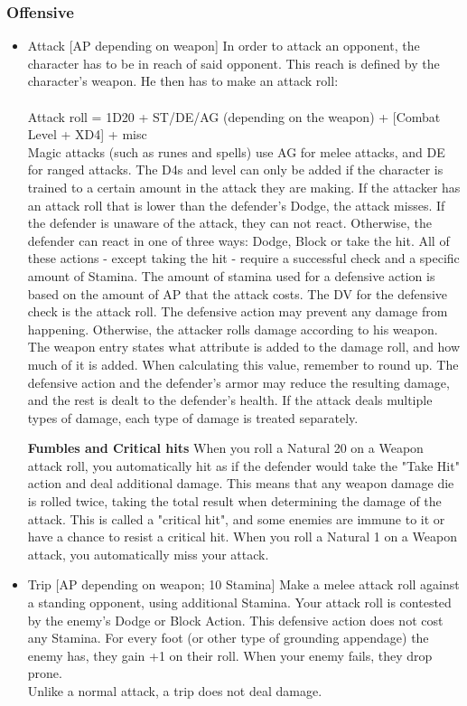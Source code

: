 \subsubsection{Offensive}
\begin{itemize}
\item Attack [AP depending on weapon]
In order to attack an opponent, the character has to be in reach of said opponent.
This reach is defined by the character's weapon.
He then has to make an attack roll:\\
\\
Attack roll = 1D20 + ST/DE/AG (depending on the weapon) + [Combat Level + XD4] + misc
\\
Magic attacks (such as runes and spells) use AG for melee attacks, and DE for ranged attacks.
The D4s and level can only be added if the character is trained to a certain amount in the attack they are making.
If the attacker has an attack roll that is lower than the defender's Dodge, the attack misses.
If the defender is unaware of the attack, they can not react.
Otherwise, the defender can react in one of three ways: Dodge, Block or take the hit.
All of these actions - except taking the hit - require a successful check and a specific amount of Stamina.
The amount of stamina used for a defensive action is based on the amount of  AP that the attack costs.
The DV for the defensive check is the attack roll.
The defensive action may prevent any damage from happening.
Otherwise, the attacker rolls damage according to his weapon.
The weapon entry states what attribute is added to the damage roll, and how much of it is added.
When calculating this value, remember to round up.
The defensive action and the defender's armor may reduce the resulting damage, and the rest is dealt to the defender's health.
If the attack deals multiple types of damage, each type of damage is treated separately.


\textbf{Fumbles and Critical hits}
When you roll a Natural 20 on a Weapon attack roll, you automatically hit as if the defender would take the "Take Hit" action and deal additional damage.
This means that any weapon damage die is rolled twice, taking the total result when determining the damage of the attack.
This is called a "critical hit", and some enemies are immune to it or have a chance to resist a critical hit.
When you roll a Natural 1 on a Weapon attack, you automatically miss your attack.


\item Trip [AP depending on weapon; 10 Stamina]
Make a melee attack roll against a standing opponent, using additional Stamina.
Your attack roll is contested by the enemy's Dodge or Block Action.
This defensive action does not cost any Stamina.
For every foot (or other type of grounding appendage) the enemy has, they gain +1 on their roll.
When your enemy fails, they drop prone.\\
Unlike a normal attack, a trip does not deal damage.\\



\end{itemize}
